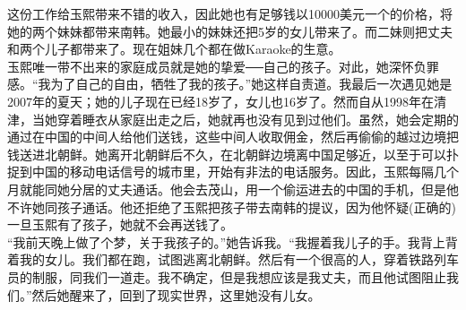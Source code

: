 这份工作给玉熙带来不错的收入，因此她也有足够钱以10000美元一个的价格，将她的两个妹妹都带来南韩。她最小的妹妹还把5岁的女儿带来了。而二妹则把丈夫和两个儿子都带来了。现在姐妹几个都在做Karaoke的生意。\\

玉熙唯一带不出来的家庭成员就是她的挚爱──自己的孩子。对此，她深怀负罪感。“我为了自己的自由，牺牲了我的孩子。”她这样自责道。我最后一次遇见她是2007年的夏天；她的儿子现在已经18岁了，女儿也16岁了。然而自从1998年在清津，当她穿着睡衣从家庭出走之后，她就再也没有见到过他们。虽然，她会定期的通过在中国的中间人给他们送钱，这些中间人收取佣金，然后再偷偷的越过边境把钱送进北朝鲜。她离开北朝鲜后不久，在北朝鲜边境离中国足够近，以至于可以扑捉到中国的移动电话信号的城市里，开始有非法的电话服务。因此，玉熙每隔几个月就能同她分居的丈夫通话。他会去茂山，用一个偷运进去的中国的手机，但是他不许她同孩子通话。他还拒绝了玉熙把孩子带去南韩的提议，因为他怀疑(正确的)一旦玉熙有了孩子，她就不会再送钱了。\\

“我前天晚上做了个梦，关于我孩子的。”她告诉我。“我握着我儿子的手。我背上背着我的女儿。我们都在跑，试图逃离北朝鲜。然后有一个很高的人，穿着铁路列车员的制服，同我们一道走。我不确定，但是我想应该是我丈夫，而且他试图阻止我们。”然后她醒来了，回到了现实世界，这里她没有儿女。\\
